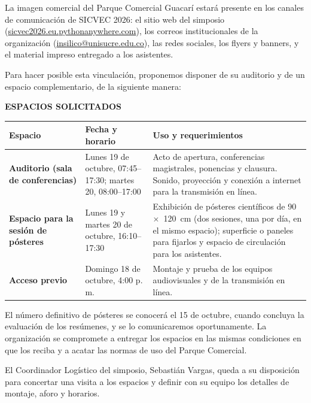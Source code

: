 \documentclass[11pt,a4paper]{article}
\begin{document}
La imagen comercial del Parque Comercial Guacarí estará presente en los canales de comunicación de SICVEC 2026: el sitio web del simposio (\href{https://sicvec2026.eu.pythonanywhere.com}{sicvec2026.eu.pythonanywhere.com}), los correos institucionales de la organización (\href{mailto:insilico@unisucre.edu.co}{insilico@unisucre.edu.co}), las redes sociales, los flyers y banners, y el material impreso entregado a los asistentes.

Para hacer posible esta vinculación, proponemos disponer de su auditorio y de un espacio complementario, de la siguiente manera:

\vspace{0.3cm}

\needspace{7cm}
\noindent
\textbf{ESPACIOS SOLICITADOS}

{\small\renewcommand{\arraystretch}{1.3}
\begin{tabular}{@{}>{\raggedright\arraybackslash}p{3.4cm}>{\raggedright\arraybackslash}p{4.6cm}>{\raggedright\arraybackslash}p{8.3cm}@{}}
\textbf{Espacio} & \textbf{Fecha y horario} & \textbf{Uso y requerimientos} \\
\hline
\textbf{Auditorio (sala de conferencias)} & Lunes 19 de octubre, 07:45--17:30; martes 20, 08:00--17:00 & Acto de apertura, conferencias magistrales, ponencias y clausura. Sonido, proyección y conexión a internet para la transmisión en línea. \\
\textbf{Espacio para la sesión de pósteres} & Lunes 19 y martes 20 de octubre, 16:10--17:30 & Exhibición de pósteres científicos de 90~$\times$~120~cm (dos sesiones, una por día, en el mismo espacio); superficie o paneles para fijarlos y espacio de circulación para los asistentes. \\
\textbf{Acceso previo} & Domingo 18 de octubre, 4:00 p.\,m. & Montaje y prueba de los equipos audiovisuales y de la transmisión en línea. \\
\end{tabular}}

\vspace{0.3cm}

El número definitivo de pósteres se conocerá el 15 de octubre, cuando concluya la evaluación de los resúmenes, y se lo comunicaremos oportunamente. La organización se compromete a entregar los espacios en las mismas condiciones en que los reciba y a acatar las normas de uso del Parque Comercial.

El Coordinador Logístico del simposio, Sebastián Vargas, queda a su disposición para concertar una visita a los espacios y definir con su equipo los detalles de montaje, aforo y horarios.
\end{document}
